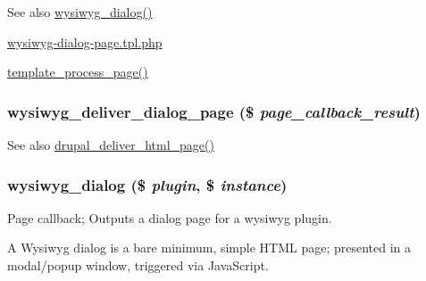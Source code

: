 \begin{DoxySeeAlso}{See also}
\hyperlink{wysiwyg_8dialog_8inc_a57c7ce003075f4a07b9a555a822755b8}{wysiwyg\_\-dialog()} 

\hyperlink{wysiwyg-dialog-page_8tpl_8php}{wysiwyg-\/dialog-\/page.tpl.php} 

\hyperlink{includes_2theme_8inc_aa9c8d115ebdc2baeae402b3d7e6b392b}{template\_\-process\_\-page()} 
\end{DoxySeeAlso}
\hypertarget{wysiwyg_8dialog_8inc_a11742186be99db206b09a5682afa2130}{
\subsubsection[{wysiwyg\_\-deliver\_\-dialog\_\-page}]{\setlength{\rightskip}{0pt plus 5cm}wysiwyg\_\-deliver\_\-dialog\_\-page (\$ {\em page\_\-callback\_\-result})}}
\label{wysiwyg_8dialog_8inc_a11742186be99db206b09a5682afa2130}
\begin{DoxySeeAlso}{See also}
\hyperlink{common_8inc_a05ab0d6e81d6cbe2a6b9f645b9e710ec}{drupal\_\-deliver\_\-html\_\-page()} 
\end{DoxySeeAlso}
\hypertarget{wysiwyg_8dialog_8inc_a57c7ce003075f4a07b9a555a822755b8}{
\subsubsection[{wysiwyg\_\-dialog}]{\setlength{\rightskip}{0pt plus 5cm}wysiwyg\_\-dialog (\$ {\em plugin}, \/  \$ {\em instance})}}
\label{wysiwyg_8dialog_8inc_a57c7ce003075f4a07b9a555a822755b8}
Page callback; Outputs a dialog page for a wysiwyg plugin.

A Wysiwyg dialog is a bare minimum, simple HTML page; presented in a modal/popup window, triggered via JavaScript.

